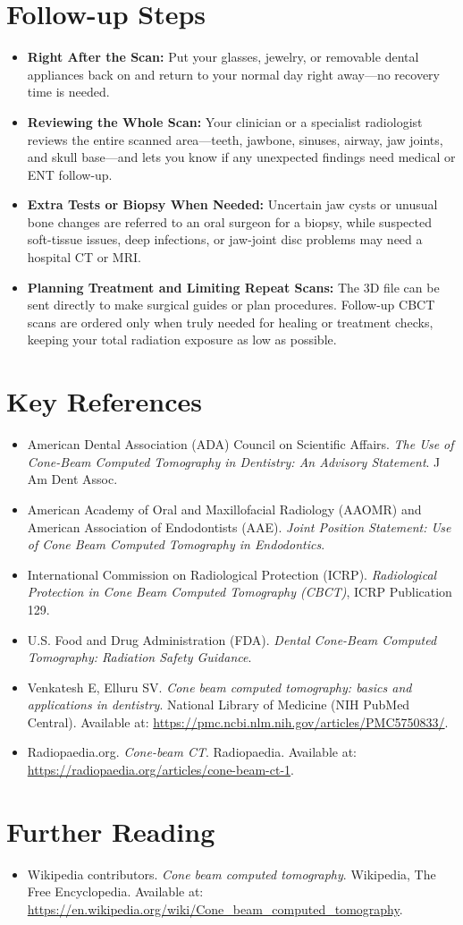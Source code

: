\section{Follow-up Steps}
\begin{itemize}
    \item \textbf{Right After the Scan:} Put your glasses, jewelry, or removable dental appliances back on and return to your normal day right away---no recovery time is needed.
    \item \textbf{Reviewing the Whole Scan:} Your clinician or a specialist radiologist reviews the entire scanned area---teeth, jawbone, sinuses, airway, jaw joints, and skull base---and lets you know if any unexpected findings need medical or ENT follow-up.
    \item \textbf{Extra Tests or Biopsy When Needed:} Uncertain jaw cysts or unusual bone changes are referred to an oral surgeon for a biopsy, while suspected soft-tissue issues, deep infections, or jaw-joint disc problems may need a hospital CT or MRI.
    \item \textbf{Planning Treatment and Limiting Repeat Scans:} The 3D file can be sent directly to make surgical guides or plan procedures. Follow-up CBCT scans are ordered only when truly needed for healing or treatment checks, keeping your total radiation exposure as low as possible.
\end{itemize}

\section{Key References}
\begin{itemize}
    \item American Dental Association (ADA) Council on Scientific Affairs. \textit{The Use of Cone-Beam Computed Tomography in Dentistry: An Advisory Statement}. J Am Dent Assoc.
    \item American Academy of Oral and Maxillofacial Radiology (AAOMR) and American Association of Endodontists (AAE). \textit{Joint Position Statement: Use of Cone Beam Computed Tomography in Endodontics}.
    \item International Commission on Radiological Protection (ICRP). \textit{Radiological Protection in Cone Beam Computed Tomography (CBCT)}, ICRP Publication 129.
    \item U.S. Food and Drug Administration (FDA). \textit{Dental Cone-Beam Computed Tomography: Radiation Safety Guidance}.
    \item Venkatesh E, Elluru SV. \textit{Cone beam computed tomography: basics and applications in dentistry}. National Library of Medicine (NIH PubMed Central). Available at: \url{https://pmc.ncbi.nlm.nih.gov/articles/PMC5750833/}.
    \item Radiopaedia.org. \textit{Cone-beam CT}. Radiopaedia. Available at: \url{https://radiopaedia.org/articles/cone-beam-ct-1}.
\end{itemize}

\section{Further Reading}
\begin{itemize}
  \item Wikipedia contributors. \textit{Cone beam computed tomography}. Wikipedia, The Free Encyclopedia. Available at: \url{https://en.wikipedia.org/wiki/Cone_beam_computed_tomography}.
\end{itemize}
